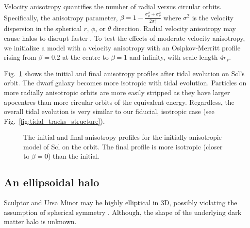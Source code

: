 Velocity anisotropy quantifies the number of radial versus circular
orbits. Specifically, the anisotropy parameter,
\(\beta = 1 - \frac{\sigma_{\phi}^2 + \sigma_\theta^2}{2\sigma_{r}^2}\)
where \(\sigma^2\) is the velocity dispersion in the spherical \(r\),
\(\phi\), or \(\theta\) direction. Radial velocity anisotropy may cause
halos to disrupt faster \citep[e.g.][]{chiang+bosch+schive2024}. To test
the effects of moderate velocity anisotropy, we initialize a model with
a velocity anisotropy with an Osipkov-Merritt profile rising from
\(\beta=0.2\) at the centre to \(\beta=1\) and infinity, with scale
length \(4r_s\).

Fig.~\ref{fig:anisotropy_i_f} shows the initial and final anisotropy
profiles after tidal evolution on Scl's \smallperi{} orbit. The dwarf
galaxy becomes more isotropic with tidal evolution. Particles on more
radially anisotropic orbits are more easily stripped as they have larger
apocentres than more circular orbits of the equivalent energy.
Regardless, the overall tidal evolution is very similar to our fiducial,
isotropic case (see Fig.~\ref{fig:tidal_tracks_structure}).

\begin{figure}
\centering
{}
\caption[Tidal evolution of anisotropy]{The initial and final anisotropy
profiles for the initially anisotropic model of Scl on the \smallperi{}
orbit. The final profile is more isotropic (closer to \(\beta=0\)) than
the initial.}\label{fig:anisotropy_i_f}
\end{figure}

\subsection{An ellipsoidal halo}\label{an-ellipsoidal-halo}

Sculptor and Ursa Minor may be highly elliptical in 3D, possibly
violating the assumption of spherical symmetry
\citep[e.g.,][]{an+koposov2022}. Although, the shape of the underlying
dark matter halo is unknown.


